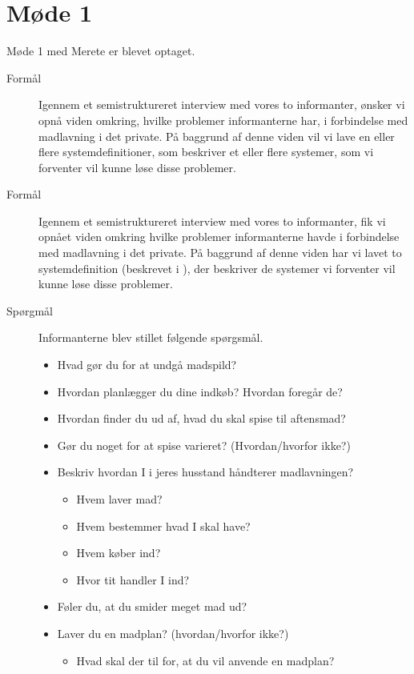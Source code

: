\section{Møde 1}

Møde 1 med Merete er blevet optaget\cite{moede1merete}.

\begin{description}
\item[Formål] Igennem et semistruktureret interview med vores to informanter, ønsker vi opnå viden omkring, hvilke problemer informanterne har, i forbindelse med madlavning i det private. På baggrund af denne viden vil vi lave en eller flere systemdefinitioner, som beskriver et eller flere systemer, som vi forventer vil kunne løse disse problemer. 
\item[Formål] Igennem et semistruktureret interview med vores to informanter, fik vi opnået viden omkring hvilke problemer informanterne havde i forbindelse med madlavning i det private. På baggrund af denne viden har vi lavet to systemdefinition (beskrevet i ), der beskriver de systemer vi forventer vil kunne løse disse problemer.

\item[Spørgmål] Informanterne blev stillet følgende spørgsmål.

\begin{itemize}[noitemsep]
\item Hvad gør du for at undgå madspild?
\item Hvordan planlægger du dine indkøb? Hvordan foregår de?
\item Hvordan finder du ud af, hvad du skal spise til aftensmad?
\item Gør du noget for at spise varieret? (Hvordan/hvorfor ikke?)
\item Beskriv hvordan I i jeres husstand håndterer madlavningen?
\begin{itemize}[noitemsep]
\item Hvem laver mad?
\item Hvem bestemmer hvad I skal have?
\item Hvem køber ind?
\item Hvor tit handler I ind?
\end{itemize}
\item Føler du, at du smider meget mad ud?
\item Laver du en madplan? (hvordan/hvorfor ikke?)
\begin{itemize}[noitemsep]
\item Hvad skal der til for, at du vil anvende en madplan?
\end{itemize}
\end{itemize}


\end{description}
